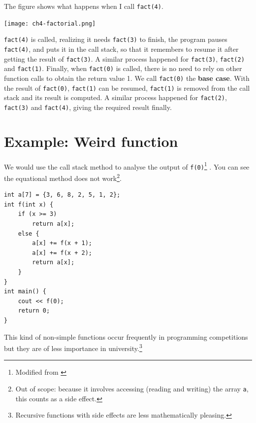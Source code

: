 The figure shows what happens when I call \texttt{fact(4)}.

\texttt{[image: ch4-factorial.png]}

\texttt{fact(4)} is called, realizing it needs \texttt{fact(3)} to finish, the program pauses \texttt{fact(4)}, and puts it in the call stack, so that it remembers to resume it after getting the result of \texttt{fact(3)}. A similar process happened for \texttt{fact(3)}, \texttt{fact(2)} and \texttt{fact(1)}. Finally, when \texttt{fact(0)} is called, there is no need to rely on other function calls to obtain the return value 1. We call \texttt{fact(0)} the \textbf{base case}. With the result of \texttt{fact(0)}, \texttt{fact(1)} can be resumed, \texttt{fact(1)} is removed from the call stack and its result is computed. A similar process happened for \texttt{fact(2)}, \texttt{fact(3)} and \texttt{fact(4)}, giving the required result finally.
\vspace{6mm}

\section{Example: Weird function}

We would use the call stack method to analyse the output of \texttt{f(0)}\footnote{Modified from \cite{hkoi:hs2022}} . You can see the equational method does not work\footnote{Out of scope: because it involves accessing (reading and writing) the array \texttt{a}, this counts as a side effect.}.

\begin{lstlisting}
int a[7] = {3, 6, 8, 2, 5, 1, 2};
int f(int x) {
    if (x >= 3)
        return a[x];
    else {
        a[x] += f(x + 1);
        a[x] += f(x + 2);
        return a[x];
    }
}
int main() {
    cout << f(0);
    return 0;
} 
\end{lstlisting}

This kind of non-simple functions occur frequently in programming competitions but they are of less importance in university.\footnote{Recursive functions with side effects are less mathematically pleasing.}

